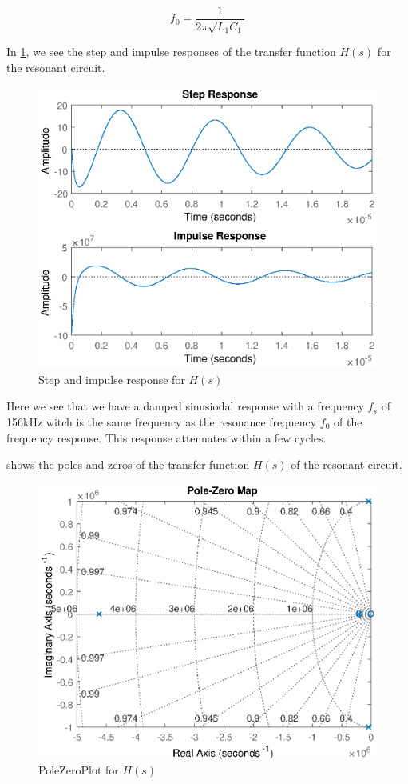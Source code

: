 \begin{equation} \label{eq:f0}
    f_0 = \frac{1}{2 \pi \sqrt{L_1 C_1}}
\end{equation}

In \cref{fig:step}, we see the step and impulse responses of the transfer function $H(s)$ for the resonant circuit.

\begin{figure}[H]
    \centering
    \includegraphics[width=\textwidth]{img/CoilRigResponse.eps}
    \caption{Step and impulse response for $H(s)$}
    \label{fig:step}
\end{figure}

Here we see that we have a damped sinusiodal response with a frequency $f_s$ of 156kHz witch is the same frequency as the resonance frequency $f_0$ of the frequency response. This response attenuates within a few cycles.

 shows the poles and zeros of the transfer function $H(s)$ of the resonant circuit.

\begin{figure}[H]
    \centering
    \includegraphics[width=\textwidth]{img/CoilRigPoleZeroPlot.eps}
    \caption{PoleZeroPlot for $H(s)$}
    \label{fig:polezero}
\end{figure}

